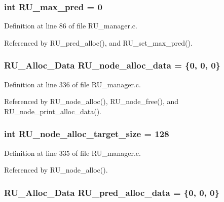 \subsubsection{\setlength{\rightskip}{0pt plus 5cm}int \bf{RU\_\-max\_\-pred} = 0}\label{RU__manager_8c_b7005c442d3e96f4e308bc03d86a5e6f}




Definition at line 86 of file RU\_\-manager.c.

Referenced by RU\_\-pred\_\-alloc(), and RU\_\-set\_\-max\_\-pred().
\subsubsection{\setlength{\rightskip}{0pt plus 5cm}\bf{RU\_\-Alloc\_\-Data} \bf{RU\_\-node\_\-alloc\_\-data} = \{0, 0, 0\}\hspace{0.3cm}{\tt  [static]}}\label{RU__manager_8c_2304aff567f58368fbccf2420c81d705}




Definition at line 336 of file RU\_\-manager.c.

Referenced by RU\_\-node\_\-alloc(), RU\_\-node\_\-free(), and RU\_\-node\_\-print\_\-alloc\_\-data().
\subsubsection{\setlength{\rightskip}{0pt plus 5cm}int \bf{RU\_\-node\_\-alloc\_\-target\_\-size} = 128}\label{RU__manager_8c_1914198ed1e4792f3b272b0388cca222}




Definition at line 335 of file RU\_\-manager.c.

Referenced by RU\_\-node\_\-alloc().
\subsubsection{\setlength{\rightskip}{0pt plus 5cm}\bf{RU\_\-Alloc\_\-Data} \bf{RU\_\-pred\_\-alloc\_\-data} = \{0, 0, 0\}\hspace{0.3cm}{\tt  [static]}}\label{RU__manager_8c_6eaa9be91382d71648e535c178fe054b}




